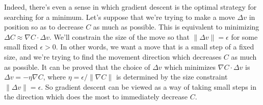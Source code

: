 Indeed, there's even a sense in which gradient descent is the optimal strategy for searching for a minimum. Let's suppose that we're trying to make a move $\Delta v$ in position so as to decrease $C$ as much as possible. This is equivalent to minimizing $\Delta C \approx \nabla C \cdot \Delta v$. We'll constrain the size of the move so that $\| \Delta v \| = \epsilon$ for some small fixed $\epsilon > 0$. In other words, we want a move that is a small step of a fixed size, and we're trying to find the movement direction which decreases $C$ as much as possible. It can be proved that the choice of $\Delta v$ which minimizes $\nabla C \cdot \Delta v$ is $\Delta v = - \eta \nabla C$, where $\eta = \epsilon / \|\nabla C\|$ is determined by the size constraint $\|\Delta v\| = \epsilon$. So gradient descent can be viewed as a way of taking small steps in the direction which does the most to immediately decrease $C$.



